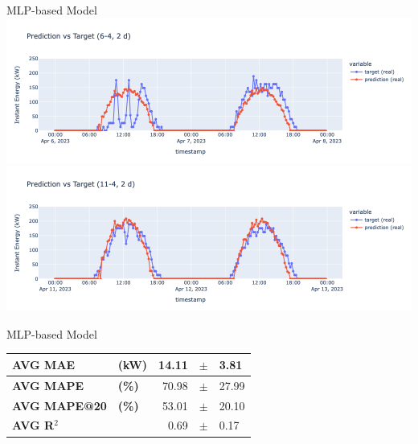 \begin{frame}{MLP-based Model}
    \includegraphics[width=\textwidth]{sections/5_eval/imgs/mlp/ufcpred6-4.png}
    \includegraphics[width=\textwidth]{sections/5_eval/imgs/mlp/ufcpred11-4.png}
\end{frame}

\begin{frame}{MLP-based Model}
    \centering
    \begin{table}[]
        \centering
        \begin{tabular}{ll|rcl}
            \textbf{AVG MAE} &\textbf{(kW)} & 14.11 &$\pm$ &3.81\\
            \hline
            \textbf{AVG MAPE}& \textbf{(\%)} & 70.98 &$\pm$ &27.99 \\
            \hline
            \textbf{AVG MAPE@20} &\textbf{(\%)} & 53.01 &$\pm$ &20.10 \\
            \hline
            \textbf{AVG R$^2$} && 0.69 &$\pm$ &0.17
            
        \end{tabular}
    \end{table}
\end{frame}

